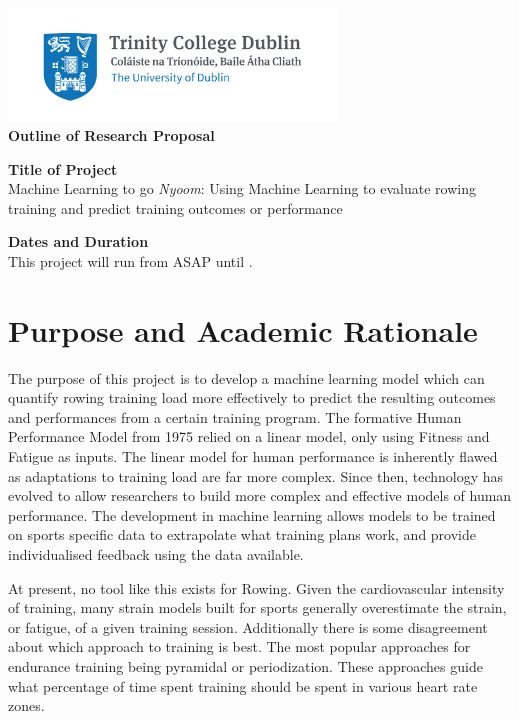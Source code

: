 \begin{center}
    \includegraphics[height=3cm]{info-sheet/Trinity_RGB_transparent_main.png}\\
    {\Large\textbf{Outline of Research Proposal}}
\end{center}

\textbf{Title of Project}\\
Machine Learning to go \textit{Nyoom}: Using Machine Learning to evaluate rowing training and predict training outcomes or performance

\textbf{Dates and Duration}\\
This project will run from ASAP until \deadline.

\section*{Purpose and Academic Rationale}
The purpose of this project is to develop a machine learning model which can quantify rowing training load more effectively to predict the resulting outcomes and performances from a certain training program. The formative Human Performance Model from 1975 relied on a linear model, only using Fitness and Fatigue as inputs. The linear model for human performance is inherently flawed as adaptations to training load are far more complex. Since then, technology has evolved to allow researchers to build more complex and effective models of human performance. The development in machine learning allows models to be trained on sports specific data to extrapolate what training plans work, and provide individualised feedback using the data available.

At present, no tool like this exists for Rowing. Given the cardiovascular intensity of training, many strain models built for sports generally overestimate the strain, or fatigue, of a given training session. Additionally there is some disagreement about which approach to training is best. The most popular approaches for endurance training being pyramidal or periodization. These approaches guide what percentage of time spent training should be spent in various heart rate zones.

